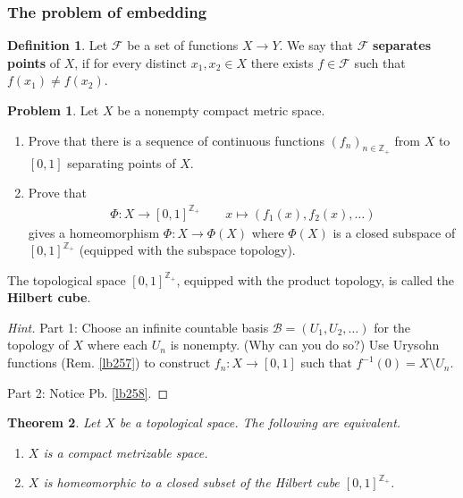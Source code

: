 \documentclass[12pt,b5paper,notitlepage]{article}
\theoremstyle{definition}
\newtheorem{df}{Definition}[section]
\newtheorem{prob}{\color{red}Problem}[section]
\theoremstyle{plain}
\newtheorem{thm}[df]{Theorem}
\newcommand{\mc}{\mathcal}
\newcommand{\scr}{\mathscr}
\newcommand{\Zbb}{\mathbb Z}
\numberwithin{equation}{section}
\begin{document}
\subsubsection{The problem of embedding}


\begin{df}\label{lb327}
Let $\scr F$ be a set of functions $X\rightarrow Y$. We say that $\scr F$ \textbf{separates points}  of $X$, if for every distinct $x_1,x_2\in X$ there exists $f\in\scr F$ such that $f(x_1)\neq f(x_2)$. 
\end{df}

\begin{prob}\label{lb259}
Let $X$ be a nonempty compact metric space.
\begin{enumerate}
\item Prove that there is a sequence of continuous functions $(f_n)_{n\in\Zbb_+}$ from $X$ to $[0,1]$ separating points of $X$. 
\item Prove that 
\begin{gather*}
\Phi:X\rightarrow [0,1]^{\Zbb_+} \qquad x\mapsto (f_1(x),f_2(x),\dots)
\end{gather*}
gives a homeomorphism $\Phi:X\rightarrow\Phi(X)$ where $\Phi(X)$ is a closed subspace of $[0,1]^{\Zbb_+}$ (equipped with the subspace topology).
\end{enumerate}
\end{prob}

The topological space $[0,1]^{\Zbb_+}$, equipped with the product topology, is called the \textbf{Hilbert cube}. 




\begin{proof}[Hint]
Part 1: Choose an infinite countable basis $\mc B=(U_1,U_2,\dots)$ for the topology of $X$ where each $U_n$ is nonempty. (Why can you do so?) Use Urysohn functions (Rem. \ref{lb257}) to construct $f_n:X\rightarrow [0,1]$ such that $f^{-1}(0)=X\setminus U_n$.

Part 2: Notice Pb. \ref{lb258}.
\end{proof}


\begin{thm}\label{lb261}
Let $X$ be a topological space. The following are equivalent.
\begin{enumerate}[label=(\arabic*)]
\item $X$ is a compact metrizable space.
\item $X$ is homeomorphic to a closed subset of the Hilbert cube $[0,1]^{\Zbb_+}$.
\end{enumerate}
\end{thm}
\end{document}
